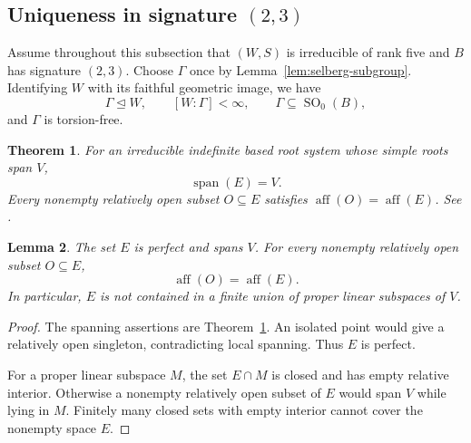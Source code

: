 \documentclass[11pt,reqno]{amsart}
\theoremstyle{plain}
\newtheorem{theorem}{Theorem}[section]
\newtheorem{lemma}[theorem]{Lemma}
\theoremstyle{definition}
\theoremstyle{remark}
\numberwithin{equation}{section}
\begin{document}
\subsection{Uniqueness in signature \texorpdfstring{$(2,3)$}{(2,3)}}

Assume throughout this subsection that $(W,S)$ is irreducible of rank five and $B$ has signature $(2,3)$. Choose $\Gamma$ once by Lemma~\ref{lem:selberg-subgroup}. Identifying $W$ with its faithful geometric image, we have
\[
\Gamma\trianglelefteq W,\qquad[W:\Gamma]<\infty,\qquad
\Gamma\subseteq\operatorname{SO}_0(B),
\]
and $\Gamma$ is torsion-free.

\begin{theorem}\label{thm:local-spanning}
For an irreducible indefinite based root system whose simple roots span $V$,
\[
\operatorname{span}(E)=V.
\]
Every nonempty relatively open subset $O\subseteq E$ satisfies $\operatorname{aff}(O)=\operatorname{aff}(E)$. See \cite[Proposition~2.5 and Theorem~6.12(a)]{DHR}.
\end{theorem}

\begin{lemma}\label{lem:23-local-spanning}
The set $E$ is perfect and spans $V$. For every nonempty relatively open subset $O\subseteq E$,
\[
\operatorname{aff}(O)=\operatorname{aff}(E).
\]
In particular, $E$ is not contained in a finite union of proper linear subspaces of $V$.
\end{lemma}
\begin{proof}
The spanning assertions are Theorem~\ref{thm:local-spanning}. An isolated point would give a relatively open singleton, contradicting local spanning. Thus $E$ is perfect.

For a proper linear subspace $M$, the set $E\cap M$ is closed and has empty relative interior. Otherwise a nonempty relatively open subset of $E$ would span $V$ while lying in $M$. Finitely many closed sets with empty interior cannot cover the nonempty space $E$.
\end{proof}
\end{document}
